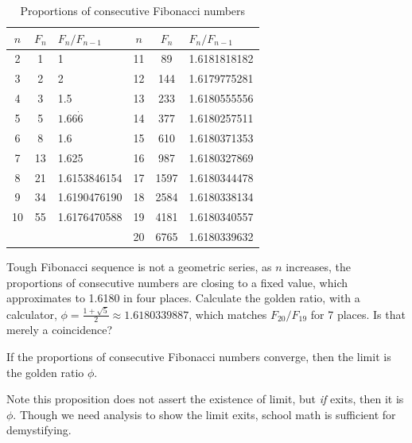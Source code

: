 \documentclass[b5paper]{article}
\begin{document}
\begin{table}[ht]
    \centering
    \begin{tabular}{|c|c|l||c|c|l|}
        \hline
        $n$ & $F_n$ & $F_n/F_{n-1}$ & $n$ & $F_n$ & $F_n/F_{n-1}$\\
        \hline
        2 & 1 & 1 &         11 & 89   & 1.6181818182 \\
        3 & 2 & 2 &        12 & 144  & 1.6179775281 \\
        4 & 3 & 1.5 &        13 & 233  & 1.6180555556 \\
        5 & 5     & $1.66\dot{6}$ &        14 & 377  & 1.6180257511 \\
        6 & 8     & 1.6 &         15 & 610  & 1.6180371353 \\
        7 & 13    & 1.625 &         16 & 987  & 1.6180327869 \\
        8 & 21    & 1.6153846154 &        17 & 1597 & 1.6180344478 \\
        9 & 34    & 1.6190476190 &        18 & 2584 & 1.6180338134 \\
        10 & 55   & 1.6176470588 &        19 & 4181 & 1.6180340557 \\
           &      &              &        20 & 6765 & 1.6180339632 \\
        \hline
    \end{tabular}
    \caption{Proportions of consecutive Fibonacci numbers}
    \label{tab:fibonacci-ratios}
\end{table}

Tough Fibonacci sequence is not a geometric series, as $n$ increases, the proportions of consecutive numbers are closing to a fixed value, which approximates to 1.6180 in four places. Calculate the golden ratio, with a calculator, $\phi = \frac{1+\sqrt{5}}{2} \approx 1.6180339887$, which matches $F_{20}/F_{19}$ for 7 places. Is that merely a coincidence?

\begin{proposition}
If the proportions of consecutive Fibonacci numbers converge, then the limit is the golden ratio $\phi$.
\end{proposition}

Note this proposition does not assert the existence of limit, but \emph{if} exits, then it is $\phi$. Though we need analysis to show the limit exits, school math is sufficient for demystifying.
\end{document}
